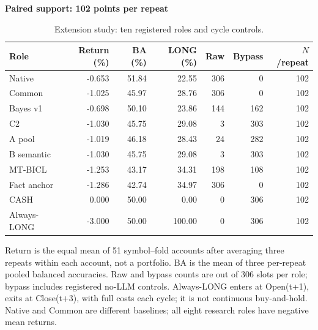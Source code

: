 \begin{table}[p]
\centering\small
\setlength{\tabcolsep}{3pt}
\renewcommand{\arraystretch}{1.12}
\caption{Extension study: ten registered roles and cycle controls.}
\label{tab:u09-comparison}
\textbf{Paired support: 102 points per repeat}\par\smallskip
\begin{tabular}{lrrrrrr}
\hline
Role & Return (\%) & BA (\%) & LONG (\%) & Raw & Bypass & $N$/repeat \\
\hline
Native & -0.653 & 51.84 & 22.55 & 306 & 0 & 102 \\
Common & -1.025 & 45.97 & 28.76 & 306 & 0 & 102 \\
Bayes v1 & -0.698 & 50.10 & 23.86 & 144 & 162 & 102 \\
C2 & -1.030 & 45.75 & 29.08 & 3 & 303 & 102 \\
A pool & -1.019 & 46.18 & 28.43 & 24 & 282 & 102 \\
B semantic & -1.030 & 45.75 & 29.08 & 3 & 303 & 102 \\
MT-BICL & -1.253 & 43.17 & 34.31 & 198 & 108 & 102 \\
Fact anchor & -1.286 & 42.74 & 34.97 & 306 & 0 & 102 \\
CASH & 0.000 & 50.00 & 0.00 & 0 & 306 & 102 \\
Always-LONG & -3.000 & 50.00 & 100.00 & 0 & 306 & 102 \\
\hline
\end{tabular}\par\medskip
\begin{minipage}{\textwidth}\footnotesize Return is the equal mean of 51 symbol--fold accounts after averaging three repeats within each account, not a portfolio. BA is the mean of three per-repeat pooled balanced accuracies. Raw and bypass counts are out of 306 slots per role; bypass includes registered no-LLM controls. Always-LONG enters at Open(t+1), exits at Close(t+3), with full costs each cycle; it is not continuous buy-and-hold. Native and Common are different baselines; all eight research roles have negative mean returns.\end{minipage}
\end{table}
